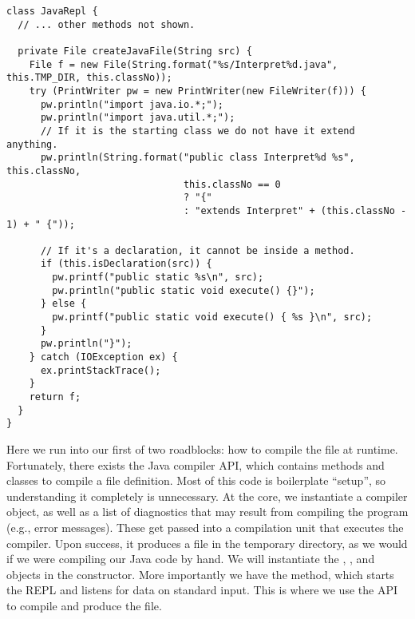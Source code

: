 \begin{cl}[]{}
\begin{lstlisting}[language=MyJava]
class JavaRepl {
  // ... other methods not shown.
  
  private File createJavaFile(String src) {
    File f = new File(String.format("%s/Interpret%d.java", this.TMP_DIR, this.classNo));
    try (PrintWriter pw = new PrintWriter(new FileWriter(f))) {
      pw.println("import java.io.*;");
      pw.println("import java.util.*;");
      // If it is the starting class we do not have it extend anything.
      pw.println(String.format("public class Interpret%d %s", this.classNo,
                               this.classNo == 0
                               ? "{" 
                               : "extends Interpret" + (this.classNo - 1) + " {"));

      // If it's a declaration, it cannot be inside a method.
      if (this.isDeclaration(src)) {
        pw.printf("public static %s\n", src);
        pw.println("public static void execute() {}");
      } else {
        pw.printf("public static void execute() { %s }\n", src);
      }
      pw.println("}");
    } catch (IOException ex) {
      ex.printStackTrace();
    }
    return f;
  }
}
\end{lstlisting}
\end{cl}

Here we run into our first of two roadblocks: how to compile the file at runtime. Fortunately, there exists the Java compiler API, which contains methods and classes to compile a file definition. Most of this code is boilerplate ``setup'', so understanding it completely is unnecessary. At the core, we instantiate a compiler object, as well as a list of diagnostics that may result from compiling the program (e.g., error messages). These get passed into a compilation unit that executes the compiler. Upon success, it produces a  file in the temporary directory, as we would if we were compiling our Java code by hand. We will instantiate the , , and  objects in the constructor. More importantly we have the  method, which starts the REPL and listens for data on standard input. This is where we use the API to compile and produce the  file.   

